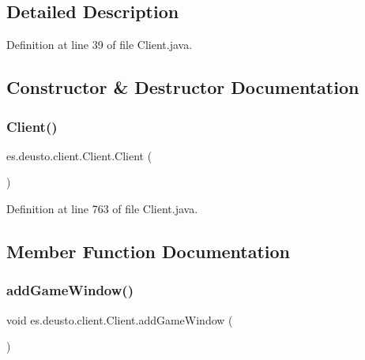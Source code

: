 \subsection{Detailed Description}


Definition at line 39 of file Client.\+java.



\subsection{Constructor \& Destructor Documentation}
\mbox{\label{classes_1_1deusto_1_1client_1_1_client_a71c03e318a72447da873297f3364f67f}} 
\subsubsection{\texorpdfstring{Client()}{Client()}}
{\footnotesize\ttfamily es.\+deusto.\+client.\+Client.\+Client (\begin{DoxyParamCaption}{ }\end{DoxyParamCaption})}



Definition at line 763 of file Client.\+java.



\subsection{Member Function Documentation}
\mbox{\label{classes_1_1deusto_1_1client_1_1_client_ac331cfb4a526be39d17a9d43136dc153}} 
\subsubsection{\texorpdfstring{add\+Game\+Window()}{addGameWindow()}}
{\footnotesize\ttfamily void es.\+deusto.\+client.\+Client.\+add\+Game\+Window (\begin{DoxyParamCaption}{ }\end{DoxyParamCaption})}



